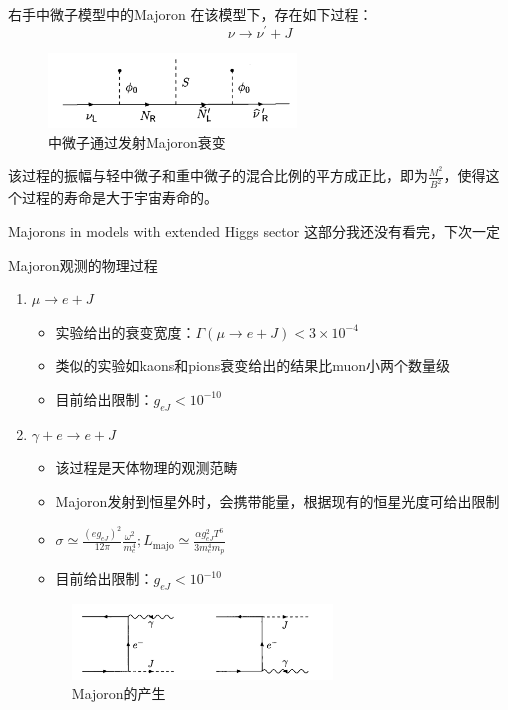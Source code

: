 \documentclass[11pt]{beamer}
\begin{document}
\begin{frame}{右手中微子模型中的Majoron}
在该模型下，存在如下过程：
$$
\nu \rightarrow \nu^{\prime}+J
$$
\begin{figure}[H]
 \centering
 \includegraphics[height=2cm]{pic/2.png}
 \caption{中微子通过发射Majoron衰变}
 \label{fig:2}
\end{figure}
该过程的振幅与轻中微子和重中微子的混合比例的平方成正比，即为$\frac{M^2}{B^2}$，使得这个过程的寿命是大于宇宙寿命的。
\end{frame}

\begin{frame}{Majorons in models with extended Higgs sector}
这部分我还没有看完，下次一定
\end{frame}

\begin{frame}{Majoron观测的物理过程}
\begin{enumerate}
\item {$\mu \rightarrow e+J$
\begin{itemize}
\item {实验给出的衰变宽度：$\Gamma(\mu \rightarrow e+J)<3\times 10^{-4}$}
\item {类似的实验如kaons和pions衰变给出的结果比muon小两个数量级}
\item {目前给出限制：$g_{eJ}<10^{-10}$}
\end{itemize}}
\item {$\gamma+e \rightarrow e + J$
\begin{itemize}
\item {该过程是天体物理的观测范畴}
\item {Majoron发射到恒星外时，会携带能量，根据现有的恒星光度可给出限制}
\item {$
\sigma \simeq \frac{\left(e g_{e J}\right)^{2}}{12 \pi} \frac{\omega^{2}}{m_{e}^{4}};
L_{\mathrm{majo}} \simeq \frac{\alpha g_{e J}^{2} T^{6}}{3 m_{e}^{4} m_{p}}
$}
\item {目前给出限制：$g_{eJ}<10^{-10}$}
\end{itemize}
\begin{figure}[H]
 \centering
 \includegraphics[height=2cm]{pic/3.png}
 \caption{Majoron的产生}
 \label{fig:2}
\end{figure}
}
\end{enumerate}
\end{frame}
\end{document}
